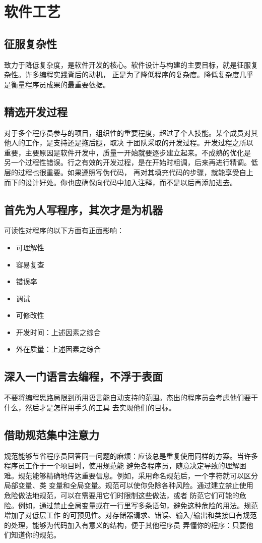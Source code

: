 \documentclass{article}
\begin{document}
\section{软件工艺}
\subsection{征服复杂性}
致力于降低复杂度，是软件开发的核心。软件设计与构建的主要目标，就是征服复杂性。许多编程实践背后的动机，
正是为了降低程序的复杂度。降低复杂度几乎是衡量程序员成果的最重要依据。

\subsection{精选开发过程}
对于多个程序员参与的项目，组织性的重要程度，超过了个人技能。某个成员对其他人的工作，是支持还是拖后腿，取决
于团队采取的开发过程。开发过程之所以重要，主要原因是软件开发中，质量一开始就要逐步建立起来。不成熟的优化是
另一个过程性错误。行之有效的开发过程，是在开始时粗调，后来再进行精调。低层的过程也很重要。如果遵照写伪代码，
再对其填充代码的步骤，就能享受自上而下的设计好处。你也应确保向代码中加入注释，而不是以后再添加进去。

\subsection{首先为人写程序，其次才是为机器}
可读性对程序的以下方面有正面影响：
\begin{itemize}
    \item 可理解性
    \item 容易复查
    \item 错误率
    \item 调试
    \item 可修改性
    \item 开发时间：上述因素之综合
    \item 外在质量：上述因素之综合
\end{itemize}

\subsection{深入一门语言去编程，不浮于表面}
不要将编程思路局限到所用语言能自动支持的范围。杰出的程序员会考虑他们要干什么，然后才是怎样用手头的工具
去实现他们的目标。

\subsection{借助规范集中注意力}
规范能够节省程序员回答同一问题的麻烦：应该总是重复使用同样的方案。当许多程序员工作于一个项目时，使用规范能
避免各程序员，随意决定导致的理解困难。规范能够精确地传达重要信息。例如，采用命名规范后，一个字符就可以区分局部变量、类
变量和全局变量。规范可以使你免除各种风险。通过建立禁止使用危险做法地规范，可以在需要用它们时限制这些做法，或者
防范它们可能的危险。例如，通过禁止全局变量或在一行里写多条语句，避免这种危险的用法。规范增加了对低层工作
的可预见性。对存储器请求、错误、输入/输出和类接口有规范的处理，能够为代码加入有意义的结构，便于其他程序员
弄懂你的程序：只要他们知道你的规范。
\end{document}

